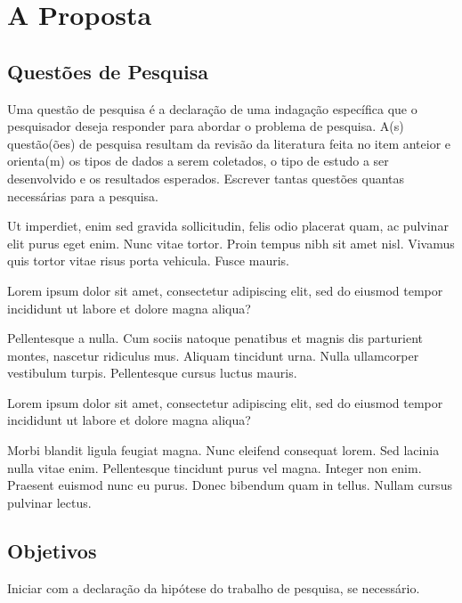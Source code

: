 %
%

\chapter{A Proposta}
\lipsum[1]

\section{Questões de Pesquisa}
\textcolor{RedOrange}{Uma questão de pesquisa é a declaração de uma indagação específica que o pesquisador deseja responder para abordar o problema de pesquisa. A(s) questão(ões) de pesquisa resultam da revisão da literatura feita no item anteior e orienta(m) os tipos de dados a serem coletados, o tipo de estudo a ser desenvolvido e os resultados esperados. Escrever tantas questões quantas necessárias para a pesquisa.}

Ut imperdiet, enim sed gravida sollicitudin, felis odio placerat quam, ac pulvinar elit purus eget enim. Nunc vitae tortor. Proin tempus nibh sit amet nisl. Vivamus quis tortor vitae risus porta vehicula. Fusce mauris.

\begin{qpesq}
Lorem ipsum dolor sit amet, consectetur adipiscing elit, sed do eiusmod tempor incididunt ut labore et dolore magna aliqua?
\end{qpesq}

Pellentesque a nulla. Cum sociis natoque penatibus et magnis dis parturient montes, nascetur ridiculus mus. Aliquam tincidunt urna. Nulla ullamcorper vestibulum turpis. Pellentesque cursus luctus mauris.

\begin{qpesq}
Lorem ipsum dolor sit amet, consectetur adipiscing elit, sed do eiusmod tempor incididunt ut labore et dolore magna aliqua?
\end{qpesq}

Morbi blandit ligula feugiat magna. Nunc eleifend consequat lorem. Sed lacinia nulla vitae enim. Pellentesque tincidunt purus vel magna. Integer non enim. Praesent euismod nunc eu purus. Donec bibendum quam in tellus. Nullam cursus pulvinar lectus.


\section{Objetivos}
\textcolor{RedOrange}{Iniciar com a declaração da hipótese do trabalho de pesquisa, se necessário.}

